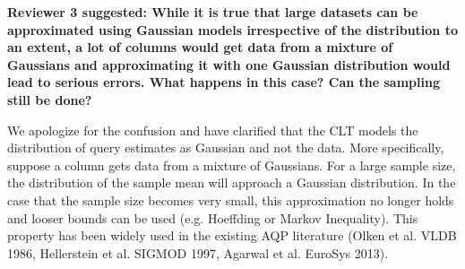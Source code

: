 \iffalse
In terms of correctness, we cite (Cui and Widom 2003) for ``Proposition 1". In the interest of space, we have clarified Definition 1 such that it clearly follows from the technique and does not require a proof.
\begin{itemize}[noitemsep]
\item Uniformity: $\widehat{S'}$ and $\widehat{S}$ are uniform random samples of $S'$ and $S$ respectively with a sampling ratio of $m$
\item Removal of Superfluous Rows: $D = \{\forall s \in \widehat{S} !\exists s' \in S': s(u) = s'(u)\}$, $D \cap \widehat{S'} = \emptyset$ 
\item Sampling of Missing Rows: $I = \{\forall s' \in \widehat{S'} !\exists s \in S: s(u) = s'(u)\}$, $\mathbb{E}(\mid I \cap \widehat{S'} \mid) = m\mid I \mid $ 
\item Key Preservation for Updated Rows: For all $s\in \widehat{S}$ and not in $D$ or $I$, $s' \in \widehat{S}': s'(u) = s(u)$.
\end{itemize}
We prove Lemma 1, and our error bounds follow directly from the Central Limit Theorem and Bootstrap Estimation which are well known results in statistics. We have cited (Agarwal et al. 2013, Agarwal et al. 2014) which discuss the conditions under which such estimates are accurate.
\fi

\vspace{1.5em}

\textbf{Reviewer 3 suggested: While it is true that large datasets can be approximated using Gaussian models irrespective of the distribution to an extent, a lot of columns would get data from a mixture of Gaussians and approximating it with one Gaussian distribution would lead to serious errors. What happens in this case? Can the sampling still be done?}


We apologize for the confusion and have clarified that the CLT models the distribution of query estimates as Gaussian and not the data. More specifically, suppose a column gets data from a mixture of Gaussians. For a large sample size, the distribution of the sample mean will approach a Gaussian distribution. In the case that the sample size becomes very small, this approximation no longer holds and looser bounds can be used (e.g. Hoeffding or Markov Inequality). This property has been widely used in the existing AQP literature (Olken et al. VLDB 1986, Hellerstein et al. SIGMOD 1997, Agarwal et al. EuroSys 2013). 


